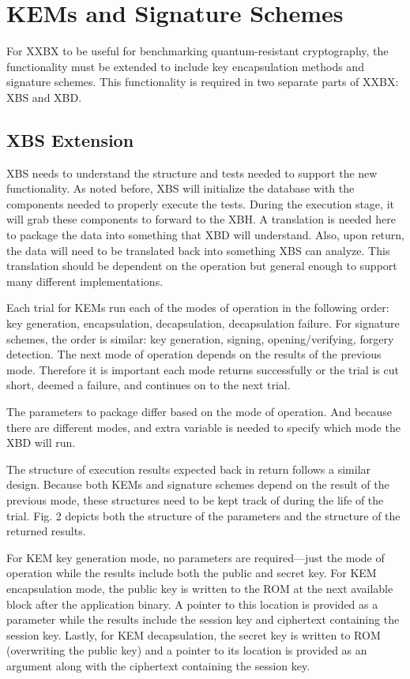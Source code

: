 \documentclass[10pt]{article}
\begin{document}
\section{KEMs and Signature Schemes}

For XXBX to be useful for benchmarking quantum-resistant cryptography, the functionality 
must be extended to include key encapsulation methods and signature schemes. This 
functionality is required in two separate parts of XXBX: XBS and XBD.

\subsection{XBS Extension}
XBS needs to understand the structure and tests needed to support the new functionality. 
As noted before, XBS will initialize the database with the components needed to properly 
execute the tests. During the execution stage, it will grab these components to forward 
to the XBH. A translation is needed here to package the data into something that XBD will 
understand. Also, upon return, the data will need to be translated back into something XBS 
can analyze. This translation should be dependent on the operation but general enough to 
support many different implementations.

Each trial for KEMs run each of the modes of operation in the following order: key generation, 
encapsulation, decapsulation, decapsulation failure. For signature schemes, the order is 
similar: key generation, signing, opening/verifying, forgery detection. The next mode of 
operation depends on the results of the previous mode. Therefore it is important each mode 
returns successfully or the trial is cut short, deemed a failure, and continues on to the 
next trial.

The parameters to package differ based on the mode of operation. And because there are 
different modes, and extra variable is needed to specify which mode the XBD will run.

The structure of execution results expected back in return follows a similar design. 
Because both KEMs and signature schemes depend on the result of the previous mode, these 
structures need to be kept track of during the life of the trial. Fig. 2 depicts both the 
structure of the parameters and the structure of the returned results.

For KEM key generation mode, no parameters are required—just the mode of operation while 
the results include both the public and secret key. For KEM encapsulation mode, the 
public key is written to the ROM at the next available block after the application binary. 
A pointer to this location is provided as a parameter while the results include the session 
key and ciphertext containing the session key. Lastly, for KEM decapsulation, the secret key 
is written to ROM (overwriting the public key) and a pointer to its location is provided as 
an argument along with the ciphertext containing the session key.
\end{document}
